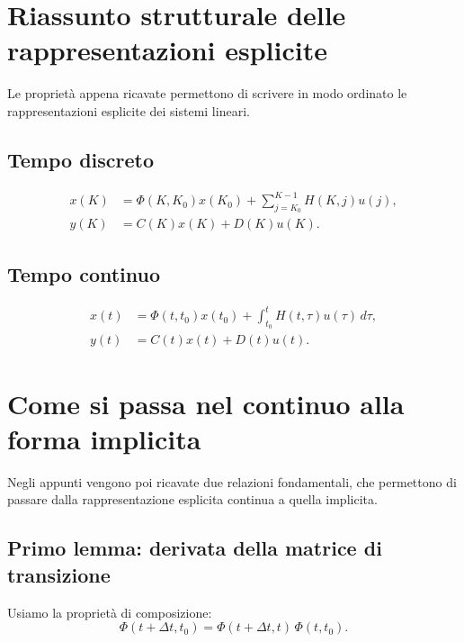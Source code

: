 \section{Riassunto strutturale delle rappresentazioni esplicite}

Le proprietà appena ricavate permettono di scrivere in modo ordinato le rappresentazioni esplicite dei sistemi lineari.

\subsection{Tempo discreto}

\begin{equation}
\boxed{
\begin{aligned}
x(K) &= \Phi(K,K_0)x(K_0)+\sum_{j=K_0}^{K-1}H(K,j)u(j),\\
y(K) &= C(K)x(K)+D(K)u(K).
\end{aligned}
}
\label{eq:L3_explicit_discrete_boxed}
\end{equation}

\subsection{Tempo continuo}

\begin{equation}
\boxed{
\begin{aligned}
x(t) &= \Phi(t,t_0)x(t_0)+\int_{t_0}^{t}H(t,\tau)u(\tau)\,d\tau,\\
y(t) &= C(t)x(t)+D(t)u(t).
\end{aligned}
}
\label{eq:L3_explicit_continuous_boxed}
\end{equation}

\section{Come si passa nel continuo alla forma implicita}

Negli appunti vengono poi ricavate due relazioni fondamentali, che permettono di passare dalla rappresentazione esplicita continua a quella implicita.

\subsection{Primo lemma: derivata della matrice di transizione}

Usiamo la proprietà di composizione:
\[
\Phi(t+\Delta t,t_0)=\Phi(t+\Delta t,t)\,\Phi(t,t_0).
\]

